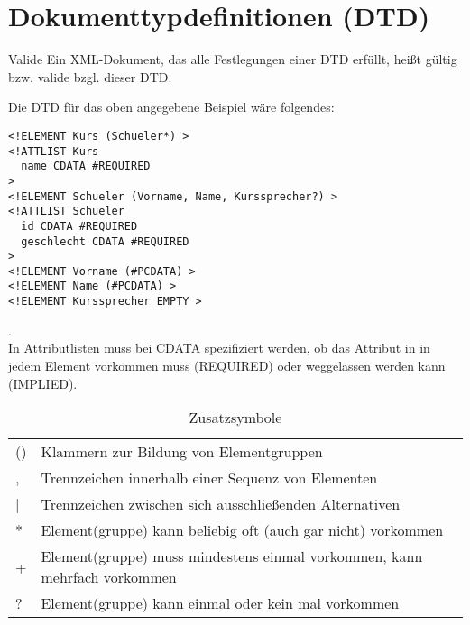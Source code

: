 \section{Dokumenttypdefinitionen (DTD)}
\begin{zitat}{Valide}
Ein XML-Dokument, das alle Festlegungen einer DTD erfüllt, heißt gültig bzw. valide bzgl. dieser DTD.
\end{zitat}
Die DTD für das oben angegebene Beispiel wäre folgendes:
\begin{lstlisting}
<!ELEMENT Kurs (Schueler*) >
<!ATTLIST Kurs
  name CDATA #REQUIRED
>
<!ELEMENT Schueler (Vorname, Name, Kurssprecher?) >
<!ATTLIST Schueler
  id CDATA #REQUIRED
  geschlecht CDATA #REQUIRED
>
<!ELEMENT Vorname (#PCDATA) >
<!ELEMENT Name (#PCDATA) >
<!ELEMENT Kurssprecher EMPTY >
\end{lstlisting}
.\\
In Attributlisten muss bei CDATA spezifiziert werden, ob das Attribut in in jedem Element vorkommen muss (REQUIRED) oder weggelassen werden kann (IMPLIED).
\begin{table}[h]
\caption{Zusatzsymbole}
\begin{tabular}{ll}
() & Klammern zur Bildung von Elementgruppen                                   \\
,  & Trennzeichen innerhalb einer Sequenz von Elementen                        \\
|  & Trennzeichen zwischen sich ausschließenden Alternativen                   \\
*  & Element(gruppe) kann beliebig oft (auch gar nicht) vorkommen              \\
+  & Element(gruppe) muss mindestens einmal vorkommen, kann mehrfach vorkommen \\
?  & Element(gruppe) kann einmal oder kein mal vorkommen
\end{tabular}
\end{table}
\newpage
